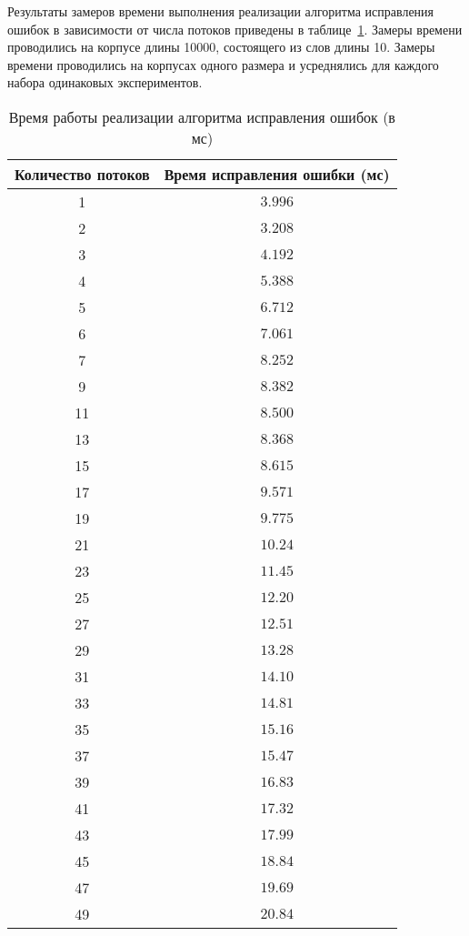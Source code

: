 Результаты замеров времени выполнения реализации алгоритма исправления ошибок в зависимости от числа потоков приведены в таблице~\ref{tbl:time_measurements}.
Замеры времени проводились на корпусе длины 10000, состоящего из слов длины 10. Замеры времени проводились на корпусах одного размера и усреднялись для каждого набора одинаковых экспериментов.

\begin{table}[H]
	\begin{center}
		\begin{threeparttable}
			\captionsetup{justification=raggedright,singlelinecheck=off}
			\caption{Время работы реализации алгоритма исправления ошибок (в мс)}
			\label{tbl:time_measurements}
			\begin{tabular}{|c|c|}
				\hline
				Количество потоков &  Время исправления ошибки (мс) \\
				\hline
		1 &$ 3.996$\\
		\hline
		2 &$ 3.208$\\
		\hline
		3 &$ 4.192$\\
		\hline
		4 &$ 5.388$\\
		\hline
		5 &$ 6.712$\\
		\hline
		6 &$ 7.061$\\
		\hline
		7 &$ 8.252$\\
		\hline
		9 &$ 8.382$\\
		\hline
		11 &$ 8.500$\\
		\hline
		13 &$ 8.368$\\
		\hline
		15 &$ 8.615$\\
		\hline
		17 &$ 9.571$\\
		\hline
		19 &$ 9.775$\\
		\hline
		21 &$ 10.24$\\
		\hline
		23 &$ 11.45$\\
		\hline
		25 &$ 12.20$\\
		\hline
		27 &$ 12.51$\\
		\hline
		29 &$ 13.28$\\
		\hline
		31 &$ 14.10$\\
		\hline
		33 &$ 14.81$\\
		\hline
		35 &$ 15.16$\\
		\hline
		37 &$ 15.47$\\
		\hline
		39 &$ 16.83$\\
		\hline
		41 &$ 17.32$\\
		\hline
		43 &$ 17.99$\\
		\hline
		45 &$ 18.84$\\
		\hline
		47 &$ 19.69$\\
		\hline
		49 &$ 20.84$\\
		\hline
		
			\end{tabular}
		\end{threeparttable}
	\end{center}
\end{table}


